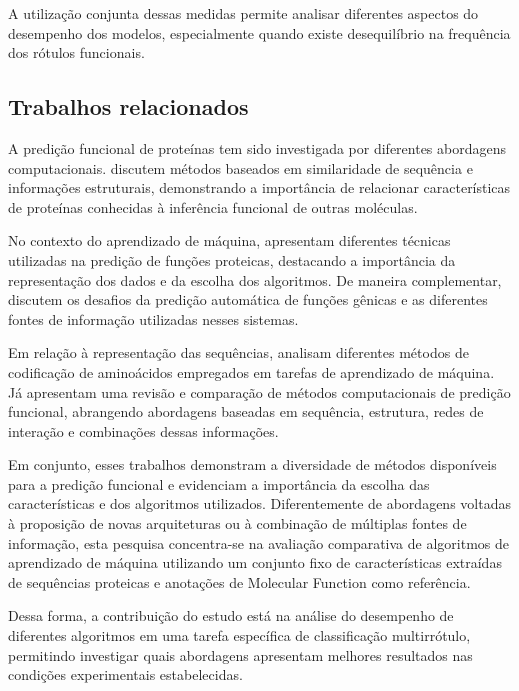 A utilização conjunta dessas medidas permite analisar diferentes aspectos do desempenho dos modelos, especialmente quando existe desequilíbrio na frequência dos rótulos funcionais.


\subsection{Trabalhos relacionados}
\label{subsec:trabalhos-relacionados}

A predição funcional de proteínas tem sido investigada por diferentes abordagens computacionais.  discutem métodos baseados em similaridade de sequência e informações estruturais, demonstrando a importância de relacionar características de proteínas conhecidas à inferência funcional de outras moléculas.

No contexto do aprendizado de máquina,  apresentam diferentes técnicas utilizadas na predição de funções proteicas, destacando a importância da representação dos dados e da escolha dos algoritmos. De maneira complementar,  discutem os desafios da predição automática de funções gênicas e as diferentes fontes de informação utilizadas nesses sistemas.

Em relação à representação das sequências,  analisam diferentes métodos de codificação de aminoácidos empregados em tarefas de aprendizado de máquina. Já  apresentam uma revisão e comparação de métodos computacionais de predição funcional, abrangendo abordagens baseadas em sequência, estrutura, redes de interação e combinações dessas informações.

Em conjunto, esses trabalhos demonstram a diversidade de métodos disponíveis para a predição funcional e evidenciam a importância da escolha das características e dos algoritmos utilizados. Diferentemente de abordagens voltadas à proposição de novas arquiteturas ou à combinação de múltiplas fontes de informação, esta pesquisa concentra-se na avaliação comparativa de algoritmos de aprendizado de máquina utilizando um conjunto fixo de características extraídas de sequências proteicas e anotações de Molecular Function como referência.

Dessa forma, a contribuição do estudo está na análise do desempenho de diferentes algoritmos em uma tarefa específica de classificação multirrótulo, permitindo investigar quais abordagens apresentam melhores resultados nas condições experimentais estabelecidas.